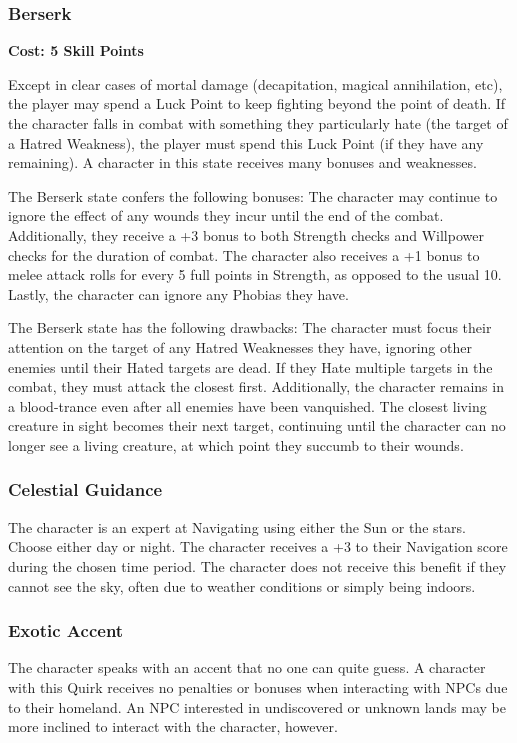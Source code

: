 \documentclass[oneside]{book}
\begin{document}
\begin{multicols}{2}
\subsubsection{Berserk}
\textbf{\small Cost: 5 Skill Points}

Except in clear cases of mortal damage (decapitation, magical annihilation, etc), the player may spend a Luck Point to keep fighting beyond the point of death. If the character falls in combat with something they particularly hate (the target of a Hatred Weakness), the player must spend this Luck Point (if they have any remaining). A character in this state receives many bonuses and weaknesses.

The Berserk state confers the following bonuses: The character may continue to ignore the effect of any wounds they incur until the end of the combat. Additionally, they receive a +3 bonus to both Strength checks and Willpower checks for the duration of combat. The character also receives a +1 bonus to melee attack rolls for every 5 full points in Strength, as opposed to the usual 10. Lastly, the character can ignore any Phobias they have.

The Berserk state has the following drawbacks: The character must focus their attention on the target of any Hatred Weaknesses they have, ignoring other enemies until their Hated targets are dead. If they Hate multiple targets in the combat, they must attack the closest first. Additionally, the character remains in a blood-trance even after all enemies have been vanquished. The closest living creature in sight becomes their next target, continuing until the character can no longer see a living creature, at which point they succumb to their wounds. 

\subsubsection{Celestial Guidance}
The character is an expert at Navigating using either the Sun or the stars. Choose either day or night. The character receives a +3 to their Navigation score during the chosen time period. The character does not receive this benefit if they cannot see the sky, often due to weather conditions or simply being indoors.

\subsubsection{Exotic Accent}
The character speaks with an accent that no one can quite guess. A character with this Quirk receives no penalties or bonuses when interacting with NPCs due to their homeland. An NPC interested in undiscovered or unknown lands may be more inclined to interact with the character, however. 


\end{multicols}
\end{document}
